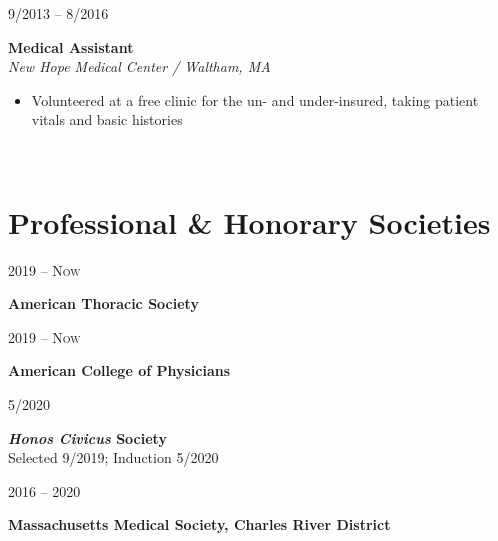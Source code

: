 \documentclass{book}
\newcommand{\entryvspace}{\vspace{0.5em}}
\newcommand\colleft{.20}
\newcommand\colright{.75}
\newcommand{\entryfour}[4]
{
	\begin{minipage}[t]{\colleft\textwidth}
		\hfill \textsc{#1}
	\end{minipage}
	\hfill\vline\hfill
	\begin{minipage}[t]{\colright\textwidth}
		{\bf#2}\\
		\textit{#3}
		\footnotesize{#4}
	\end{minipage}\\
	\entryvspace
}%
\newcommand{\entrythree}[3]
{
	\begin{minipage}[t]{\colleft\textwidth}
		\hfill \textsc{#1}
	\end{minipage}    
	\hfill\vline\hfill
	\begin{minipage}[t]{\colright\textwidth}
		{\bf#2}\\
		\footnotesize{#3}
	\end{minipage}
	\entryvspace
}%
\newcommand{\entrytwo}[2]
{
	\begin{minipage}[t]{\colleft\textwidth}
		\hfill \textsc{#1}
	\end{minipage}
	\hfill\vline\hfill
	\begin{minipage}[t]{\colright\textwidth}
		{\bf#2}
	\end{minipage}
	\entryvspace
}%
\begin{document}
	\entryfour{9/2013 -- 8/2016}{Medical Assistant}{New Hope Medical Center / Waltham, MA}{%
	\begin{itemize}
		\item Volunteered at a free clinic for the un- and under-insured, taking patient vitals and basic histories
	\end{itemize}
	}
	\section*{Professional \& Honorary Societies}
		\entrytwo{2019 -- Now}{American Thoracic Society}
		
		\entrytwo{2019 -- Now}{American College of Physicians}
		
		\entrythree{5/2020}{\textit{Honos Civicus} Society}{Selected 9/2019; Induction 5/2020}
		
		\entrytwo{2016 -- 2020}{Massachusetts Medical Society, Charles River District}
\end{document}
